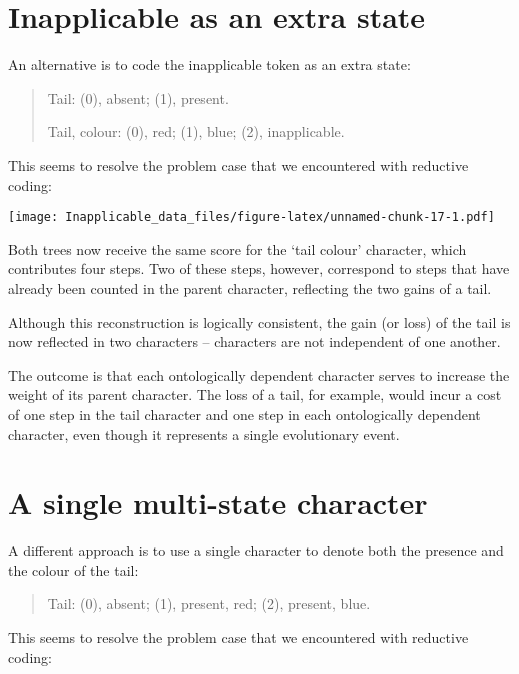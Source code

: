 \documentclass[]{book}
\theoremstyle{definition}
\theoremstyle{definition}
\theoremstyle{definition}
\theoremstyle{remark}
\begin{document}
\hypertarget{inapplicable-as-an-extra-state}{%
\section{Inapplicable as an extra
state}\label{inapplicable-as-an-extra-state}}

An alternative is to code the inapplicable token as an extra state:

\begin{quote}
Tail: (0), absent; (1), present.

Tail, colour: (0), red; (1), blue; (2), inapplicable.
\end{quote}

This seems to resolve the problem case that we encountered with
reductive coding:

\texttt{[image: Inapplicable\_data\_files/figure-latex/unnamed-chunk-17-1.pdf]}

Both trees now receive the same score for the `tail colour' character,
which contributes four steps. Two of these steps, however, correspond to
steps that have already been counted in the parent character, reflecting
the two gains of a tail.

Although this reconstruction is logically consistent, the gain (or loss)
of the tail is now reflected in two characters -- characters are not
independent of one another.

The outcome is that each ontologically dependent character serves to
increase the weight of its parent character. The loss of a tail, for
example, would incur a cost of one step in the tail character and one
step in each ontologically dependent character, even though it
represents a single evolutionary event.

\hypertarget{a-single-multi-state-character}{%
\section{A single multi-state
character}\label{a-single-multi-state-character}}

A different approach is to use a single character to denote both the
presence and the colour of the tail:

\begin{quote}
Tail: (0), absent; (1), present, red; (2), present, blue.
\end{quote}

This seems to resolve the problem case that we encountered with
reductive coding:
\end{document}
